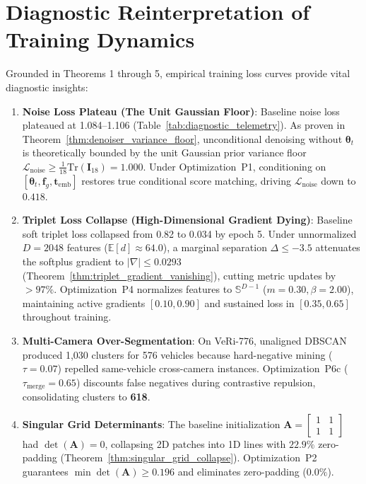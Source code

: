 \section{Diagnostic Reinterpretation of Training Dynamics}
\label{sec:diagnostic_reinterpretation}

Grounded in Theorems 1 through 5, empirical training loss curves provide vital diagnostic insights:
\begin{enumerate}[leftmargin=*]
    \item \textbf{Noise Loss Plateau (The Unit Gaussian Floor)}: Baseline noise loss plateaued at 1.084--1.106 (Table~\ref{tab:diagnostic_telemetry}). As proven in Theorem~\ref{thm:denoiser_variance_floor}, unconditional denoising without $\boldsymbol{\theta}_t$ is theoretically bounded by the unit Gaussian prior variance floor $\mathcal{L}_{\text{noise}} \ge \frac{1}{18}\text{Tr}(\mathbf{I}_{18}) = 1.000$. Under Optimization~P1, conditioning on $[\boldsymbol{\theta}_t, \mathbf{f}_g, \mathbf{t}_{\text{emb}}]$ restores true conditional score matching, driving $\mathcal{L}_{\text{noise}}$ down to $\mathbf{0.418}$.
    \item \textbf{Triplet Loss Collapse (High-Dimensional Gradient Dying)}: Baseline soft triplet loss collapsed from 0.82 to 0.034 by epoch 5. Under unnormalized $D=2048$ features ($\mathbb{E}[d] \approx 64.0$), a marginal separation $\Delta \le -3.5$ attenuates the softplus gradient to $|\nabla| \le 0.0293$ (Theorem~\ref{thm:triplet_gradient_vanishing}), cutting metric updates by $>97\%$. Optimization~P4 normalizes features to $\mathbb{S}^{D-1}$ ($m=0.30, \beta=2.00$), maintaining active gradients $[0.10, 0.90]$ and sustained loss in $[0.35, 0.65]$ throughout training.
    \item \textbf{Multi-Camera Over-Segmentation}: On VeRi-776, unaligned DBSCAN produced 1,030 clusters for 576 vehicles because hard-negative mining ($\tau=0.07$) repelled same-vehicle cross-camera instances. Optimization~P6c ($\tau_{\text{merge}}=0.65$) discounts false negatives during contrastive repulsion, consolidating clusters to \textbf{618}.
    \item \textbf{Singular Grid Determinants}: The baseline initialization $\mathbf{A} = \begin{bmatrix} 1 & 1 \\ 1 & 1 \end{bmatrix}$ had $\det(\mathbf{A}) = 0$, collapsing 2D patches into 1D lines with $22.9\%$ zero-padding (Theorem~\ref{thm:singular_grid_collapse}). Optimization~P2 guarantees $\min\det(\mathbf{A}) \ge 0.196$ and eliminates zero-padding ($0.0\%$).
\end{enumerate}

